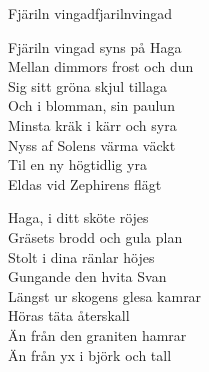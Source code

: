 \begin{song}{Fjäriln vingad}{fjarilnvingad}
\begin{vers}
Fjäriln vingad syns på Haga\\
Mellan dimmors frost och dun\\
Sig sitt gröna skjul tillaga\\
Och i blomman, sin paulun\\
Minsta kräk i kärr och syra\\
Nyss af Solens värma väckt\\
Til en ny högtidlig yra\\
Eldas vid Zephirens flägt\\
\end{vers}
\begin{vers}
Haga, i ditt sköte röjes\\
Gräsets brodd och gula plan\\
Stolt i dina ränlar höjes\\
Gungande den hvita Svan\\
Längst ur skogens glesa kamrar\\
Höras täta återskall\\
Än från den graniten hamrar\\
Än från yx i björk och tall\\
\end{vers}
\end{song}
